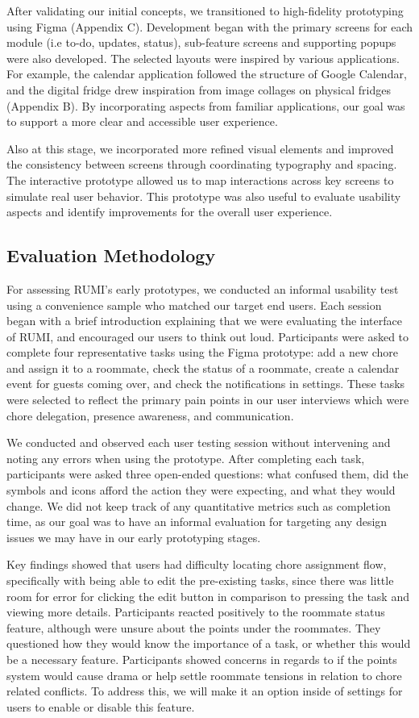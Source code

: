 \documentclass[sigconf]{acmart}
\begin{document}
After validating our initial concepts, we transitioned to high-fidelity prototyping using Figma (Appendix C). Development began with the primary screens for each module (i.e to-do, updates, status), sub-feature screens and supporting popups were also developed. The selected layouts were inspired by various applications. For example, the calendar application followed the structure of Google Calendar, and the digital fridge drew inspiration from image collages on physical fridges (Appendix B). By incorporating aspects from familiar applications, our goal was to support a more clear and accessible user experience.

Also at this stage, we incorporated more refined visual elements and improved the consistency between screens through coordinating typography and spacing. The interactive prototype allowed us to map interactions across key screens to simulate real user behavior. This prototype was also useful to evaluate usability aspects and identify improvements for the overall user experience.

\subsection{Evaluation Methodology}
For assessing RUMI's early prototypes, we conducted an informal usability test using a convenience sample who matched our target end users. Each session began with a brief introduction explaining that we were evaluating the interface of RUMI, and encouraged our users to think out loud. Participants were asked to complete four representative tasks using the Figma prototype: add a new chore and assign it to a roommate, check the status of a roommate, create a calendar event for guests coming over, and check the notifications in settings. These tasks were selected to reflect the primary pain points in our user interviews which were chore delegation, presence awareness, and communication.

We conducted and observed each user testing session without intervening and noting any errors when using the prototype. After completing each task, participants were asked three open-ended questions: what confused them, did the symbols and icons afford the action they were expecting, and what they would change. We did not keep track of any quantitative metrics such as completion time, as our goal was to have an informal evaluation for targeting any design issues we may have in our early prototyping stages.

Key findings showed that users had difficulty locating chore assignment flow, specifically with being able to edit the pre-existing tasks, since there was little room for error for clicking the edit button in comparison to pressing the task and viewing more details. Participants reacted positively to the roommate status feature, although were unsure about the points under the roommates. They questioned how they would know the importance of a task, or whether this would be a necessary feature. Participants showed concerns in regards to if the points system would cause drama or help settle roommate tensions in relation to chore related conflicts. To address this, we will make it an option inside of settings for users to enable or disable this feature.
\end{document}
